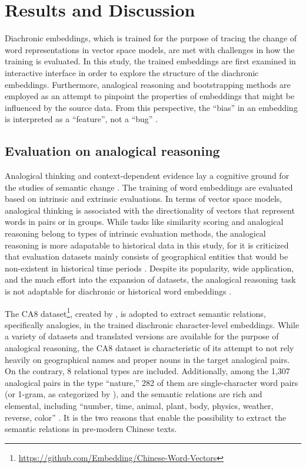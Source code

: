 

\chapter{Results and Discussion}
\label{results}

Diachronic embeddings, which is trained for the purpose of tracing the change of word representations in vector space models, are met with challenges in how the training is evaluated. In this study, the trained embeddings are first examined in interactive interface in order to explore the structure of the diachronic embeddings. Furthermore, analogical reasoning and bootstrapping methods are employed as an attempt to pinpoint the properties of embeddings that might be influenced by the source data. From this perspective, the ``bias'' in an embedding is interpreted as a ``feature'', not a ``bug'' \parencite{wevers2020digital}.

\section{Evaluation on analogical reasoning}

Analogical thinking and context-dependent evidence lay a cognitive ground for the studies of semantic change \parencite{traugott2017semantic}. The training of word embeddings are evaluated based on intrinsic and extrinsic evaluations. In terms of vector space models, analogical thinking is associated with the directionality of vectors that represent words in pairs or in groups. While tasks like similarity scoring and analogical reasoning belong to types of intrinsic evaluation methods, the analogical reasoning is more adapatable to historical data in this study, for it is criticized that evaluation datasets mainly consists of geographical entities that would be non-existent in historical time periods \parencite{wevers2020digital,li2018analogical}. Despite its popularity, wide application, and the much effort into the expansion of datasets, the analogical reasoning task is not adaptable for diachronic or historical word embeddings \parencite{wevers2020digital}.

The CA8 dataset\footnote{\url{https://github.com/Embedding/Chinese-Word-Vectors}}, created by \textcite{li2018analogical}, is adopted to extract semantic relations, specifically analogies, in the trained diachronic character-level embeddings. While a variety of datasets and translated versions are available for the purpose of analogical reasoning, the CA8 dataset is characteristic of its attempt to not rely heavily on geographical names and proper nouns in the target analogical pairs. On the contrary, 8 relational types are included. Additionally, among the 1,307 analogical pairs in the type ``nature,'' 282 of them are single-character word pairs (or 1-gram, as categorized by \textcite{li2018analogical}), and the semantic relations are rich and elemental, including ``number, time, animal, plant, body, physics, weather, reverse, color'' \parencite{li2018analogical}. It is the two reasons that enable the possibility to extract the semantic relations in pre-modern Chinese texts.

